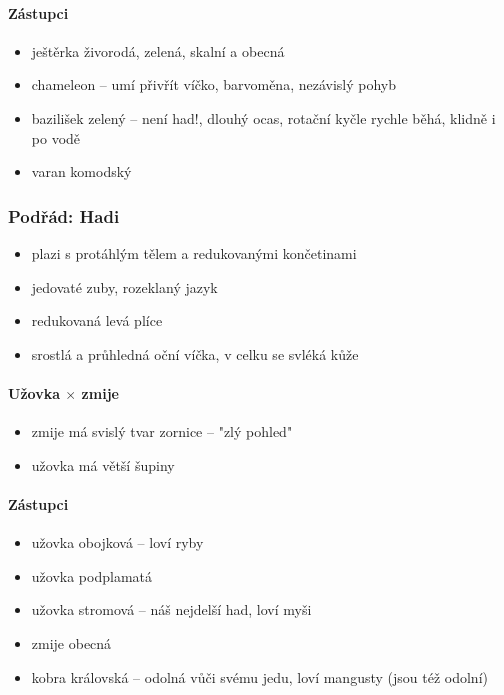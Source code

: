 \paragraph{Zástupci}
\begin{itemize}
\item ještěrka živorodá, zelená, skalní a obecná
\item chameleon -- umí přivřít víčko, barvoměna, nezávislý pohyb
\item bazilišek zelený -- není had!, dlouhý ocas, rotační kyčle \ra rychle běhá, klidně i po vodě
\item varan komodský
\end{itemize}

\subsubsection{Podřád: Hadi}
\begin{itemize}
\item plazi s protáhlým tělem a redukovanými končetinami
\item jedovaté zuby, rozeklaný jazyk
\item redukovaná levá plíce
\item srostlá a průhledná oční víčka, v celku se svléká kůže
\end{itemize}

\paragraph{Užovka $\times$ zmije}
\begin{itemize}
\item zmije má svislý tvar zornice -- "zlý pohled"
\item užovka má větší šupiny
\end{itemize}

\paragraph{Zástupci}
\begin{itemize}
\item užovka obojková -- loví ryby
\item užovka podplamatá
\item užovka stromová -- náš nejdelší had, loví myši
\item zmije obecná
\item kobra královská -- odolná vůči svému jedu, loví mangusty (jsou též odolní)
\end{itemize}

